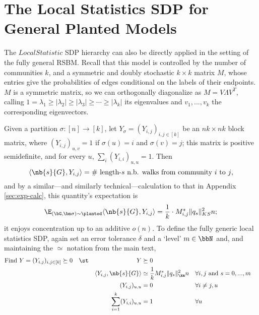 \section{The Local Statistics SDP for General Planted Models} \label{sec:generalmodel}


The $LocalStatistic$ SDP hierarchy can also be directly applied in the setting of the fully general RSBM.
%
Recall that this model is controlled by the number of communities $k$, and a symmetric and doubly stochastic $k\times k$ matrix $M$, whose entries give the probabilities of edges conditional on the labels of their endpoints. $M$ is a symmetric matrix, so we can orthogonally diagonalize as $M = V \Lambda V^{T}$, calling $1 = \lambda_1 \ge |\lambda_2| \ge |\lambda_3| \ge \cdots \ge |\lambda_k|$ its eigenvalues and $v_1,...,v_k$ the corresponding eigenvectors. 

Given a partition $\sigma  : [n] \to [k]$, let $Y_\sigma = (Y_{i,j})_{i,j\in [k]}$ be an $nk \times nk$ block matrix, where $(Y_{i,j})_{u,v} = 1$ if $\sigma(u) = i$ and $\sigma(v) = j$; this matrix is positive semidefinite, and for every $u$, $\sum_i (Y_{i,i})_{u,u} = 1$. Then 
$$
    \langle \nb{s}{G}, Y_{i,j} \rangle = \text{\# length-$s$ n.b. walks from community $i$ to $j$},
$$  
and by a similar---and similarly technical---calculation to that in Appendix \ref{sec:exp-calc}, this quantity's expectation is
$$
    \E_{(\bG,\bm \sigma)\sim \planted}  \langle \nb{s}{G}, Y_{i,j} \rangle = \frac{1}{k} \cdot M^s_{i,j} \|q_s\|_{KS}^2 n;
$$
it enjoys concentration up to an additive $o(n)$. To define the fully generic local statistics SDP, again set an error tolerance $\delta$ and a `level' $m \in \bbN$ and, and maintaining the $\simeq$ notation from the main text, 
\begin{align}
    \text{Find } Y = (Y_{i,j})_{i,j \in [k]} &\succeq 0 & &\st & Y &\succeq 0 \label{eq:gen-sdp-pos} \\
    & & & &\langle Y_{i,j}, \nb{s}{G} \rangle &\simeq \frac{1}{k}M^s_{i,j}\|q_s\|^2_{\km} n & \forall & i,j \text{ and }s=0,...,m \label{eq:gen-sdp-counts} \\ 
    & & & & (Y_{i,j})_{u,u} &= 0 & \forall & i\neq j, u \label{eq:gen-sdp-diag} \\
    & & & & \sum_{i = 1}^k (Y_{i,i})_{u,u} &= 1 & \forall &  u \label{eq:gen-sdp-trace}
\end{align}

